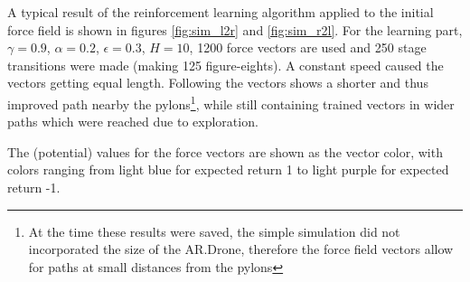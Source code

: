 \documentclass[11pt]{article}
\begin{document}
A typical result of the reinforcement learning algorithm applied to the initial force field is shown in figures \ref{fig:sim_l2r} and \ref{fig:sim_r2l}. For the learning part, $\gamma = 0.9$, $\alpha = 0.2$, $\epsilon = 0.3$, $H = 10$, 1200 force vectors are used and 250 stage transitions were made (making 125 figure-eights). A constant speed caused the vectors getting equal length. Following the vectors shows a shorter and thus improved path nearby the pylons\footnote{At the time these results were saved, the simple simulation did not incorporated the size of the AR.Drone, therefore the force field vectors allow for paths at small distances from the pylons}, while still containing trained vectors in wider paths which were reached due to exploration.

The (potential) values for the force vectors are shown as the vector color, with colors ranging from light blue for expected return 1 to light purple for expected return -1.
\end{document}
